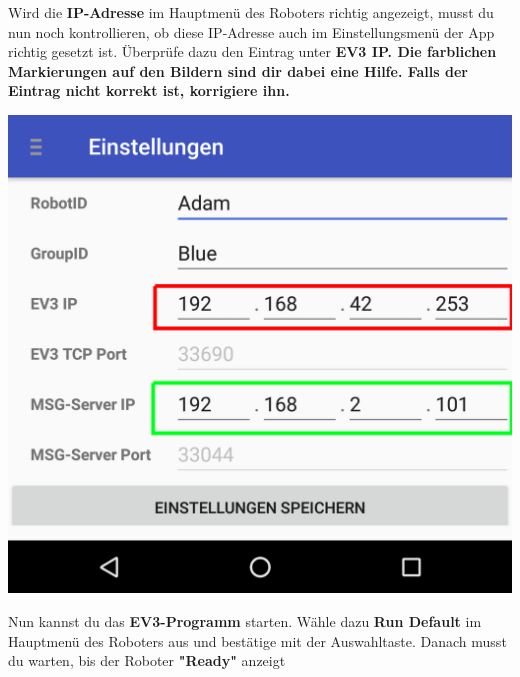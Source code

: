 \documentclass[
	12pt,
	article,
	type=bsc, %
	colorbacktitle,
	instlogo,
	accentcolor=tud1c,
	draft,
	german,
	twoside
]{tudexercise}
\begin{document}
\begin{enumerate}
	
	\begin{minipage}{.45\textwidth}
	\item Wird die \textbf{IP-Adresse} im Hauptmenü des Roboters richtig angezeigt, musst du nun noch kontrollieren, ob diese IP-Adresse auch im Einstellungsmenü der App richtig gesetzt ist. Überprüfe dazu den Eintrag unter \bf{EV3 IP}. Die farblichen Markierungen auf den Bildern sind dir dabei eine Hilfe. Falls der Eintrag nicht korrekt ist, korrigiere ihn.
	\end{minipage}
	\hspace{.05\textwidth}
	\begin{minipage}{.45\textwidth}
	\includegraphics[width=.8\textwidth]{img/app_settings_short.png}
	\end{minipage}
	\item \label{sec:afterpan}Nun kannst du das \textbf{EV3-Programm }starten. Wähle dazu \textbf{Run Default} im Hauptmenü des Roboters aus und bestätige mit der Auswahltaste. Danach musst du warten, bis der Roboter \textbf{"Ready"} anzeigt
	

\end{enumerate}
\end{document}
